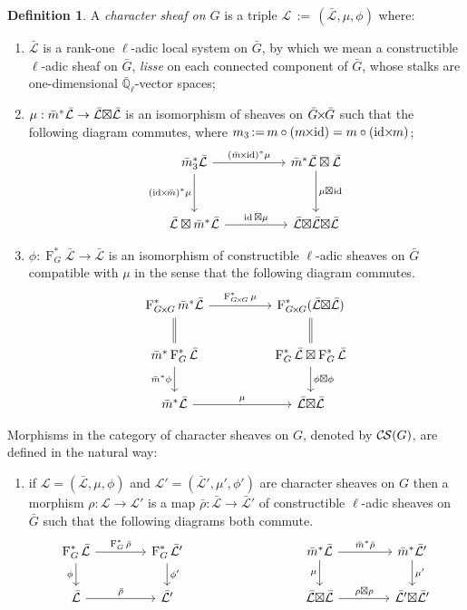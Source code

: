 \documentclass[10pt]{amsart}
\makeatletter
\theoremstyle{plain}
\theoremstyle{definition}
\newtheorem{definition}[theorem]{Definition}
\newcommand{\EE}{\mathbb{\bar Q}_\ell}
\newcommand{\Frob}[1]{\operatorname{F}_{#1}}
\DeclareMathOperator{\id}{id}
\newcommand{\ceq}{{\, :=\, }}
\newcommand{\cs}[1]{{\mathcal{#1}}}
\newcommand{\gcs}[1]{{\mathcal{\bar #1}}}
\newcommand{\CS}{{\mathcal{C\hskip-0.8pt S}}}
\newcommand{\labitem}[2]{
\def\@itemlabel{\textbf{#1}}
\item
\def\@currentlabel{#1}\label{#2}}
\newcommand{\bm}{\bar{m}}
\newcommand{\bG}{\bar{G}}
\newcommand{\brho}{{\bar\rho}}
\newcommand{\tight}[3]{\hspace{-#1pt}{#2}\hspace{-#3pt}}
\newcommand{\bGxG}{\text{$\bar{G} \tight{1}{\times}{1} \bar{G}$}}
\newcommand{\GxxG}{\text{$G \tight{1}{\times}{1} G$}}
\newcommand{\LxL}{\text{$\gcs{L} \tight{0}{\boxtimes}{0} \gcs{L}$}}
\makeatother
\begin{document}
\begin{definition}\label{def:CS}
A \emph{character sheaf on $G$} is a triple
$\cs{L}\ceq (\gcs{L},\mu,\phi)$ where:
\begin{enumerate}
\labitem{(CS.1)}{CS.1} $\gcs{L}$ is a rank-one $\ell$-adic local system on $\bG$, by which we mean a constructible $\ell$-adic sheaf on $\bG$, {\it lisse} on each connected component of $\bG$, whose stalks are one-dimensional $\EE$-vector spaces;
\labitem{(CS.2)}{CS.2} $\mu: \bm^* \gcs{L} \to \LxL$ is an isomorphism of
sheaves on $\bGxG$ such that the following diagram commutes,
  where $m_3 \ceq m\circ (m\tight{1}{\times}{2}\id) = m\circ (\id\tight{2}{\times}{1} m)$;
  \[
  \begin{tikzcd}[row sep=30]
  \bm_3^*\gcs{L} \arrow{rr}{(\bm \tight{1}{\times}{2} \id)^*\mu} \arrow[swap]{d}{(\id \tight{2}{\times}{1} \bm)^*\mu}
    &&  \bm^*\gcs{L} \boxtimes \gcs{L} \dar{\mu \tight{0}{\boxtimes}{1} \id} \\
    \gcs{L} \boxtimes \bm^* \gcs{L} \arrow{rr}{\id \boxtimes \mu}
    &&  \gcs{L} \tight{0}{\boxtimes}{0} \LxL
  \end{tikzcd}
  \]
\labitem{(CS.3)}{CS.3} $\phi : \Frob{G}^* \gcs{L} \to \gcs{L}$ is an
  isomorphism of constructible $\ell$-adic sheaves on $\bG$ compatible with
  $\mu$ in the sense that the following diagram commutes.
  \[
  \begin{tikzcd}[row sep=20]
  \Frob{\GxxG}^* \bm^* \gcs{L} \arrow{rr}{\Frob{\GxxG}^*\mu}
    && \Frob{\GxxG}^*(\LxL)\\
    \arrow[equal]{u} \bm^*  \Frob{G}^* \gcs{L} \arrow[swap]{d}{\bm^* \phi}
    && \Frob{G}^*\gcs{L}\boxtimes \Frob{G}^*\gcs{L} \dar{\phi\boxtimes \phi} \arrow[equal]{u} \\
    \bm^*\gcs{L} \arrow{rr}{\mu}
    && \LxL
  \end{tikzcd}
  \]
\end{enumerate}
\end{definition}

Morphisms in the category of character sheaves on $G$, denoted by $\CS(G)$, are defined in the natural way:
\begin{enumerate}
\labitem{(CS.4)}{CS.4} if $\cs{L} = (\gcs{L},\mu,\phi)$ and
  $\cs{L'} = (\gcs{L'},\mu',\phi')$ are character sheaves on $G$ then
  a morphism $\rho : \cs{L} \to \cs{L}'$ is a map $\brho : \gcs{L} \to \gcs{L'}$
  of constructible $\ell$-adic sheaves on $\bG$ such that the following diagrams both commute.
  \[
  \begin{tikzcd}[column sep=40]
  \Frob{G}^* \gcs{L} \rar{\Frob{G}^* \brho} \arrow[swap]{d}{\phi} & \Frob{G}^* \gcs{L'} \dar{\phi'}
  & & \arrow[swap]{d}{\mu} \bm^* \gcs{L} \rar{\bm^* \brho} & \bm^* \gcs{L'} \dar{\mu'} \\
  \gcs{L} \rar{\brho} & \gcs{L'}
  & {} & \LxL \rar{\tight{1}{\rho\boxtimes \rho}{1}} & \gcs{L'} \tight{0}{\boxtimes}{0} \gcs{L'}
  \end{tikzcd}
  \]
\end{enumerate}
\end{document}
